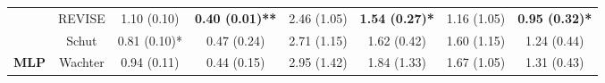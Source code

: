 \begin{table}
{\begin{tabular}[t]{>{}cccccccc}
 & REVISE & 1.10 (0.10) & \textbf{0.40 (0.01)**} & 2.46 (1.05) & \textbf{1.54 (0.27)*} & 1.16 (1.05) & \textbf{0.95 (0.32)*}\\

 & Schut & 0.81 (0.10)* & 0.47 (0.24) & 2.71 (1.15) & 1.62 (0.42) & 1.60 (1.15) & 1.24 (0.44)\\

\multirow{-6}{*}{\centering\arraybackslash \textbf{MLP}} & Wachter & 0.94 (0.11) & 0.44 (0.15) & 2.95 (1.42) & 1.84 (1.33) & 1.67 (1.05) & 1.31 (0.43)\\
\bottomrule
\end{tabular}}
\end{table}
